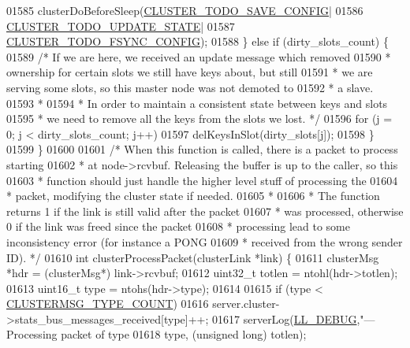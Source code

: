 \begin{DoxyCode}
{{{{{{{{{{{{{{{{{{{{{{01585         clusterDoBeforeSleep(\hyperlink{cluster_8h_a0ae5ff08fbae3c655012b4de8bfc327d}{CLUSTER\_TODO\_SAVE\_CONFIG}|
01586                              \hyperlink{cluster_8h_abea0d393cba342261e4a7e6fb745f388}{CLUSTER\_TODO\_UPDATE\_STATE}|
01587                              \hyperlink{cluster_8h_accc9a00230cd04789db2398bb3ab715a}{CLUSTER\_TODO\_FSYNC\_CONFIG});
01588     \} \textcolor{keywordflow}{else} \textcolor{keywordflow}{if} (dirty\_slots\_count) \{
01589         \textcolor{comment}{/* If we are here, we received an update message which removed}
01590 \textcolor{comment}{         * ownership for certain slots we still have keys about, but still}
01591 \textcolor{comment}{         * we are serving some slots, so this master node was not demoted to}
01592 \textcolor{comment}{         * a slave.}
01593 \textcolor{comment}{         *}
01594 \textcolor{comment}{         * In order to maintain a consistent state between keys and slots}
01595 \textcolor{comment}{         * we need to remove all the keys from the slots we lost. */}
01596         \textcolor{keywordflow}{for} (j = 0; j < dirty\_slots\_count; j++)
01597             delKeysInSlot(dirty\_slots[j]);
01598     \}
01599 \}
01600 
01601 \textcolor{comment}{/* When this function is called, there is a packet to process starting}
01602 \textcolor{comment}{ * at node->rcvbuf. Releasing the buffer is up to the caller, so this}
01603 \textcolor{comment}{ * function should just handle the higher level stuff of processing the}
01604 \textcolor{comment}{ * packet, modifying the cluster state if needed.}
01605 \textcolor{comment}{ *}
01606 \textcolor{comment}{ * The function returns 1 if the link is still valid after the packet}
01607 \textcolor{comment}{ * was processed, otherwise 0 if the link was freed since the packet}
01608 \textcolor{comment}{ * processing lead to some inconsistency error (for instance a PONG}
01609 \textcolor{comment}{ * received from the wrong sender ID). */}
01610 \textcolor{keywordtype}{int} clusterProcessPacket(clusterLink *link) \{
01611     clusterMsg *hdr = (clusterMsg*) link->rcvbuf;
01612     uint32\_t totlen = ntohl(hdr->totlen);
01613     uint16\_t type = ntohs(hdr->type);
01614 
01615     \textcolor{keywordflow}{if} (type < \hyperlink{cluster_8h_a6222c464c1f2125f42271d2abd63853e}{CLUSTERMSG\_TYPE\_COUNT})
01616         server.cluster->stats\_bus\_messages\_received[type]++;
01617     serverLog(\hyperlink{server_8h_abcaffe365dee628fcf9fc90c69d534a1}{LL\_DEBUG},\textcolor{stringliteral}{"--- Processing packet of type %
01618         type, (\textcolor{keywordtype}{unsigned} \textcolor{keywordtype}{long}) totlen);
}}}}}}}}}}}}}}}}}}}}}}}
\end{DoxyCode}
